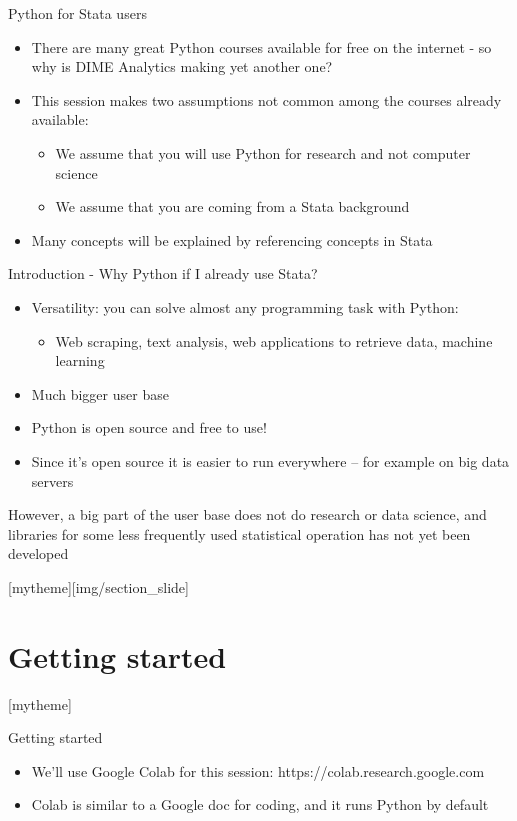 \documentclass[aspectratio=169]{beamer}
\newcommand{\sectionpic}[2]{
	\setbeamertemplate{section page}[mytheme][#2]
	\section{#1}
	\setbeamertemplate{section page}[mytheme]
}
\begin{document}
\begin{frame}{Python for Stata users}
	
	\begin{itemize}
		\item There are many great Python courses available for free on the internet - so why is DIME Analytics making yet another one?
		\item This session makes two assumptions not common among the courses already available:
		\begin{itemize}
			\item We assume that you will use Python for research and not computer science
			\item We assume that you are coming from a Stata background 
		\end{itemize}
		\item Many concepts will be explained by referencing concepts in Stata
	\end{itemize}
	
\end{frame}

\begin{frame}{Introduction - Why Python if I already use Stata?}

	\begin{itemize}
		\item Versatility: you can solve almost any programming task with Python:
		\begin{itemize}
			\item Web scraping, text analysis, web applications to retrieve data, machine learning
		\end{itemize}
		\item Much bigger user base
		\item Python is open source and free to use!
		\item Since it's open source it is easier to run everywhere -- for example on big data servers
	\end{itemize}

	However, a big part of the user base does not do research or data science, 
	and libraries for some less frequently used statistical operation 
	has not yet been developed

\end{frame}

\sectionpic{Getting started}{img/section_slide}

\begin{frame}{Getting started}

	\begin{itemize}
		\item We'll use Google Colab for this session: https://colab.research.google.com
		\item Colab is similar to a Google doc for coding, and it runs Python by default
	\end{itemize}

\end{frame}
\end{document}
